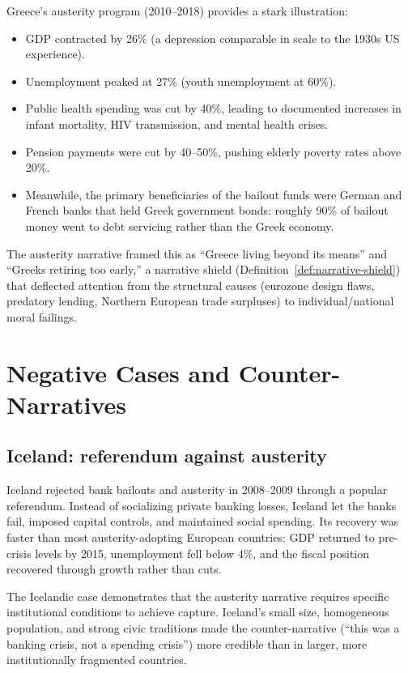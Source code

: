 \begin{example}
\label{ex:greece}
Greece's austerity program (2010--2018) provides a stark illustration:
\begin{itemize}[nosep]
  \item GDP contracted by 26\% (a depression comparable in scale to the 1930s US experience).
  \item Unemployment peaked at 27\% (youth unemployment at 60\%).
  \item Public health spending was cut by 40\%, leading to documented increases in infant mortality, HIV transmission, and mental health crises.
  \item Pension payments were cut by 40--50\%, pushing elderly poverty rates above 20\%.
  \item Meanwhile, the primary beneficiaries of the bailout funds were German and French banks that held Greek government bonds: roughly 90\% of bailout money went to debt servicing rather than the Greek economy.
\end{itemize}
The austerity narrative framed this as ``Greece living beyond its means'' and ``Greeks retiring too early,'' a narrative shield (Definition~\ref{def:narrative-shield}) that deflected attention from the structural causes (eurozone design flaws, predatory lending, Northern European trade surpluses) to individual/national moral failings.
\end{example}

\section{Negative Cases and Counter-Narratives}
\label{sec:ch25-negative}

\subsection{Iceland: referendum against austerity}

Iceland rejected bank bailouts and austerity in 2008--2009 through a popular referendum.
Instead of socializing private banking losses, Iceland let the banks fail, imposed capital controls, and maintained social spending.
Its recovery was faster than most austerity-adopting European countries: GDP returned to pre-crisis levels by 2015, unemployment fell below 4\%, and the fiscal position recovered through growth rather than cuts.

The Icelandic case demonstrates that the austerity narrative requires specific institutional conditions to achieve capture.
Iceland's small size, homogeneous population, and strong civic traditions made the counter-narrative (``this was a banking crisis, not a spending crisis'') more credible than in larger, more institutionally fragmented countries.

